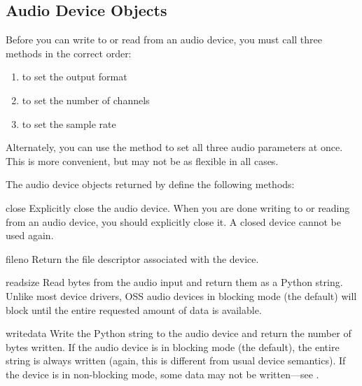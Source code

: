 \subsection{Audio Device Objects \label{ossaudio-device-objects}}

Before you can write to or read from an audio device, you must call
three methods in the correct order:
\begin{enumerate}
\item {} to set the output format
\item {} to set the number of channels
\item {} to set the sample rate
\end{enumerate}
Alternately, you can use the  method to set all
three audio parameters at once.  This is more convenient, but may not be
as flexible in all cases.

The audio device objects returned by  define the
following methods:

\begin{methoddesc}{close}{}
Explicitly close the audio device.  When you are done writing to or
reading from an audio device, you should explicitly close it.  A closed
device cannot be used again.
\end{methoddesc}

\begin{methoddesc}{fileno}{}
Return the file descriptor associated with the device.
\end{methoddesc}

\begin{methoddesc}{read}{size}
Read  bytes from the audio input and return them as a Python
string.  Unlike most \UNIX{} device drivers, OSS audio devices in
blocking mode (the default) will block  until the
entire requested amount of data is available.
\end{methoddesc}

\begin{methoddesc}{write}{data}
Write the Python string  to the audio device and return the
number of bytes written.  If the audio device is in blocking mode (the
default), the entire string is always written (again, this is different
from usual \UNIX{} device semantics).  If the device is in non-blocking
mode, some data may not be written---see .
\end{methoddesc}

